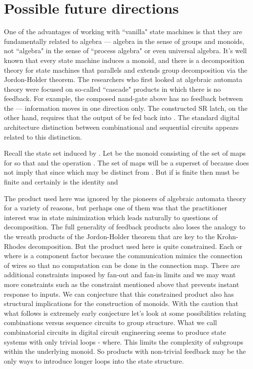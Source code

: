 \documentclass[runningheads,letter]{llncs}
\begin{document}
\section{Possible future directions\label{sec:conjecture}}


One of the advantages of working with ``vanilla" state machines is that they are fundamentally related to algebra --- algebra in the sense of groups and monoids, not ``algebra" in the sense of ``process algebra" or even universal algebra. It's
well known that every state machine induces a monoid, and there is a decomposition theory for state machines that parallels
and extends group decomposition via the Jordon-Holder theorem.  The researchers who first looked at algebraic automata
theory were focused on so-called ``cascade" products in which there is no feedback\cite{Arbibabs,Holcombe,ginzburg}.
For example, the composed nand-gate
above has no feedback between the  --- information moves in one direction only. The constructed SR latch, on the
other hand, requires that the output of  be fed back into . The standard digital architecture distinction
between combinational and sequential circuits appears related to this distinction. 

Recall  the state set induced by . Let  be the monoid consisting
of the set of maps
 for  so that  and the operation
. The set of maps will be a superset of  because
 does not imply that  since  which
may be distinct from . But if  is finite then  must be
finite and certainly  is the identity and


The product used here was ignored by the pioneers of algebraic automata theory for a variety of reasons, but
perhaps one of them was that the practitioner interest was in state minimization which leads naturally to
questions of decomposition. The full generality of feedback products also loses the analogy to the
wreath products of the Jordon-Holder theorem that are key to the Krohn-Rhodes decomposition. But
the product used here is quite constrained. Each  or  where  is
a component factor because the 
communication mimics the connection of wires so that no computation can be done in the connection map. There
are additional constraints imposed by fan-out and fan-in limits and we may want more constraints such as
the  constraint mentioned above that prevents instant response to inputs.
We can conjecture that this constrained
product also has structural implications for the construction of monoids. With the caution that
what follows is extremely early conjecture let's look at some possibilities relating combinations versus
sequence circuits to group structure.  What we call
combinatorial circuits in digital circuit engineering seems to produce state systems with only trivial loops - where.  This limits the complexity of subgroups within the underlying monoid. So products
with non-trivial feedback may be the only ways to introduce longer loops into the state structure.



\end{document}
